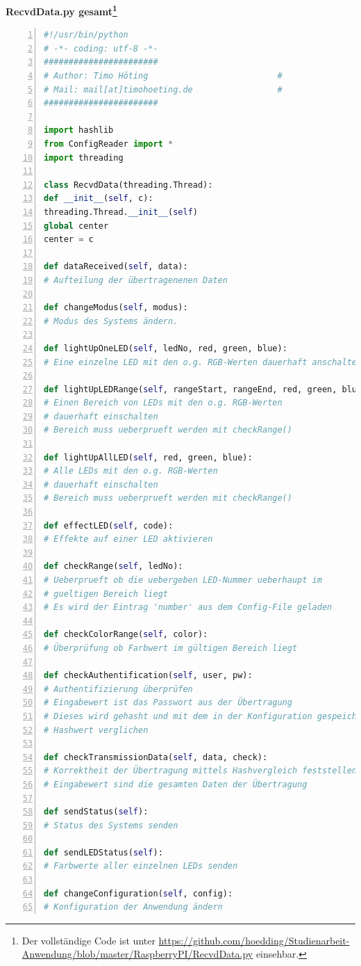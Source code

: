 \textbf{RecvdData.py gesamt\footnote{Der vollständige Code ist unter \url{https://github.com/hoedding/Studienarbeit-Anwendung/blob/master/RaspberryPI/RecvdData.py} einsehbar.}} 
\begin{lstlisting}[caption =Implementierung des Nachrichten-Verarbeitung in Python, language=python, frame=single, breaklines=true,columns=fullflexible, commentstyle=\color{gray}\upshape, captionpos=b, numbers = left]
#!/usr/bin/python
# -*- coding: utf-8 -*-
#######################
# Author: Timo Höting                          #
# Mail: mail[at]timohoeting.de                 #
#######################

import hashlib
from ConfigReader import *
import threading

class RecvdData(threading.Thread):
def __init__(self, c):
threading.Thread.__init__(self)
global center
center = c

def dataReceived(self, data):
# Aufteilung der übertragenenen Daten

def changeModus(self, modus):
# Modus des Systems ändern.

def lightUpOneLED(self, ledNo, red, green, blue):
# Eine einzelne LED mit den o.g. RGB-Werten dauerhaft anschalten

def lightUpLEDRange(self, rangeStart, rangeEnd, red, green, blue):
# Einen Bereich von LEDs mit den o.g. RGB-Werten
# dauerhaft einschalten
# Bereich muss ueberprueft werden mit checkRange()

def lightUpAllLED(self, red, green, blue):
# Alle LEDs mit den o.g. RGB-Werten
# dauerhaft einschalten
# Bereich muss ueberprueft werden mit checkRange()

def effectLED(self, code):
# Effekte auf einer LED aktivieren

def checkRange(self, ledNo):
# Ueberprueft ob die uebergeben LED-Nummer ueberhaupt im
# gueltigen Bereich liegt
# Es wird der Eintrag 'number' aus dem Config-File geladen

def checkColorRange(self, color):
# Überprüfung ob Farbwert im gültigen Bereich liegt

def checkAuthentification(self, user, pw):
# Authentifizierung überprüfen
# Eingabewert ist das Passwort aus der Übertragung
# Dieses wird gehasht und mit dem in der Konfiguration gespeicherten
# Hashwert verglichen

def checkTransmissionData(self, data, check):
# Korrektheit der Übertragung mittels Hashvergleich feststellen
# Eingabewert sind die gesamten Daten der Übertragung

def sendStatus(self):
# Status des Systems senden

def sendLEDStatus(self):
# Farbwerte aller einzelnen LEDs senden

def changeConfiguration(self, config):
# Konfiguration der Anwendung ändern
\end{lstlisting}



